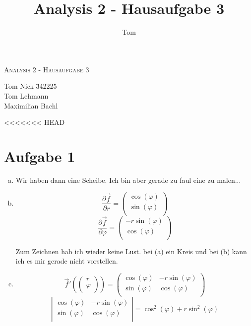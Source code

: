 \documentclass[10pt,a4paper,parskip=half]{scrartcl}
\author{Tom}
\title{Analysis 2 - Hausaufgabe 3}
\newcommand{\vectwo}[2]{\left(\begin {array} {c}#1\\#2\\\end {array} \right)}
\newcommand{\mattwotwo}[4]{\left(\begin {array} {cc}#1 & #3\\#2 & #4\\\end {array} \right)}
\newcommand{\dettwotwo}[4]{\left|\begin {array} {cc}#1 & #3\\#2 & #4\\\end {array} \right|}
\begin{document}
\begin{center}
\textsc{\Large{Analysis 2 - Hausaufgabe 3}} \\
\end{center}
\begin{tabbing}
Tom Nick \hspace{1.4cm}\= 342225\\
Tom Lehmann\\
Maximilian Bachl
\end{tabbing}
<<<<<<< HEAD
\section*{Aufgabe 1}
\begin{enumerate}[(a)]
\item
Wir haben dann eine Scheibe. Ich bin aber gerade zu faul eine zu malen...
\item
$$ \frac{\partial \vec f}{\partial r} = \vectwo{\cos(\varphi)}{\sin(\varphi)}$$
$$ \frac{\partial \vec f}{\partial \varphi} = \vectwo{-r\sin(\varphi)}{\cos(\varphi)}$$

Zum Zeichnen hab ich wieder keine Lust. bei (a) ein Kreis und bei (b) kann ich es mir gerade nicht vorstellen.
\item
$$ \vec f'(\vectwo{r}{\varphi}) = \mattwotwo{\cos(\varphi)}{\sin(\varphi)}{-r\sin(\varphi)}{\cos(\varphi)} $$
$$\dettwotwo{\cos(\varphi)}{\sin(\varphi)}{-r\sin(\varphi)}{\cos(\varphi)} = \cos^2(\varphi) + r\sin^2(\varphi)$$
\end{enumerate}
\end{document}
